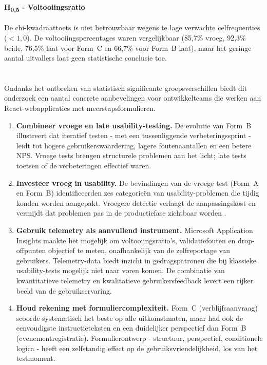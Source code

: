 \paragraph{H\textsubscript{0,5} - Voltooiingsratio}
De chi-kwadraattoets is niet betrouwbaar wegens te lage verwachte celfrequenties ($< 1{,}0$). De voltooiingspercentages waren vergelijkbaar (85,7\% vroeg, 92,3\% beide, 76,5\% laat voor Form~C en 66,7\% voor Form~B laat), maar het geringe aantal uitvallers laat geen statistische conclusie toe.

\section{}

Ondanks het ontbreken van statistisch significante groepsverschillen biedt dit onderzoek een aantal concrete aanbevelingen voor ontwikkelteams die werken aan React-webapplicaties met meerstapsformulieren.

\begin{enumerate}
  \item \textbf{Combineer vroege en late usability-testing.} De evolutie van Form~B illustreert dat iteratief testen - met een tussenliggende verbeteringssprint - leidt tot hogere gebruikerswaardering, lagere foutenaantallen en een betere NPS. Vroege tests brengen structurele problemen aan het licht; late tests toetsen of de verbeteringen effectief waren.

  \item \textbf{Investeer vroeg in usability.} De bevindingen van de vroege test (Form~A en Form~B) identificeerden zes categorieën van usability-problemen die tijdig konden worden aangepakt. Vroegere detectie verlaagt de aanpassingskost en vermijdt dat problemen pas in de productiefase zichtbaar worden \autocite{Boehm1981}.

  \item \textbf{Gebruik telemetry als aanvullend instrument.} Microsoft Application Insights maakte het mogelijk om voltooiingsratio's, validatiefouten en drop-offpunten objectief te meten, onafhankelijk van de zelfreportage van gebruikers. Telemetry-data biedt inzicht in gedragspatronen die bij klassieke usability-tests mogelijk niet naar voren komen. De combinatie van kwantitatieve telemetry en kwalitatieve gebruikersfeedback levert een rijker beeld van de gebruikservaring.

  \item \textbf{Houd rekening met formuliercomplexiteit.} Form~C (verblijfsaanvraag) scoorde systematisch het beste op alle uitkomstmaten, maar had ook de eenvoudigste instructieteksten en een duidelijker perspectief dan Form~B (evenementregistratie). Formulierontwerp - structuur, perspectief, conditionele logica - heeft een zelfstandig effect op de gebruiksvriendelijkheid, los van het testmoment.
\end{enumerate}

